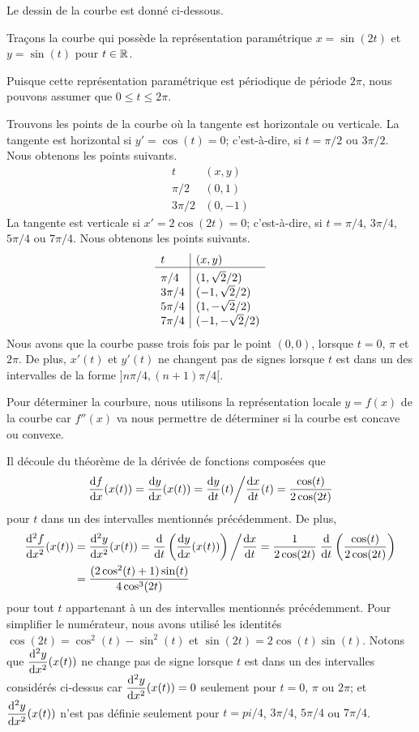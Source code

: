 {\begin{egg}[\theory]
Le dessin de la courbe est donné ci-dessous.
\end{egg}

\begin{egg}[\theory]
Traçons la courbe qui possède la représentation paramétrique
$x = \sin(2t)$ et $y = \sin(t)$ pour $t \in \RR$.

Puisque cette représentation paramétrique est périodique de période
$2\pi$, nous pouvons assumer que $0\leq t \leq 2\pi$.

Trouvons les points de la courbe où la tangente est
horizontale ou verticale.  La tangente est horizontal si
$y'= \cos(t)= 0$; c'est-à-dire, si $t= \pi/2$ ou $3\pi/2$.  Nous obtenons
les points suivants.
\[
\begin{array}{l|l}
t & (x,y) \\
\hline
\pi/2 & (0,1) \\
3\pi/2 & (0,-1)
\end{array}
\]
La tangente est verticale si $x'= 2\cos(2t) = 0$; c'est-à-dire, si
$t=\pi/4$, $3\pi/4$, $5\pi/4$ ou $7\pi/4$.  Nous obtenons les points
suivants.
\[
\begin{array}{l|l}
t & (x,y) \\
\hline
\rule{0em}{1.2em} \pi/4 & (1, \sqrt{2}/2) \\
3\pi/4 & (-1, \sqrt{2}/2) \\
5\pi/4 & (1, -\sqrt{2}/2) \\
7\pi/4 & (-1, -\sqrt{2}/2)
\end{array}
\]
Nous avons que la courbe passe trois fois par le point $(0,0)$, lorsque
$t=0$, $\pi$ et $2\pi$.  De plus, $x'(t)$ et $y'(t)$ ne changent pas
de signes lorsque $t$ est dans un des intervalles de la forme
$]n\pi/4 , (n+1)\pi/4[$. 

Pour déterminer la courbure, nous utilisons la représentation locale
$y=f(x)$ de la courbe car $f''(x)$ va nous permettre de déterminer
si la courbe est concave ou convexe.

Il découle du théorème de la dérivée de fonctions composées que
\[
\dydx{f}{x}(x(t)) = \dydx{y}{x}(x(t)) = \dydx{y}{t}(t) \bigg/ \dydx{x}{t}(t)
= \frac{\cos(t)}{2\cos(2t)}
\]
pour $t$ dans un des intervalles mentionnés précédemment.  De plus,
\begin{align*}
\dydxn{f}{x}{2}(x(t)) &= \dydxn{y}{x}{2}(x(t)) =
\dfdx{\left( \dydx{y}{x}(x(t)) \right)}{t}\bigg/\dydx{x}{t}
= \frac{1}{2\cos(2t)}\;
\dfdx{\left( \frac{\cos(t)}{2\cos(2t)} \right)}{t} \\
&= \frac{(2\cos^2(t)+1)\sin(t)}{4\cos^3(2t)}
\end{align*}
pour tout $t$ appartenant à un des intervalles mentionnés
précédemment.  Pour simplifier le numérateur, nous avons utilisé les
identités $\cos(2t) = \cos^2(t)-\sin^2(t)$ et $\sin(2t) = 2\cos(t)\sin(t)$.
Notons que $\displaystyle \dydxn{y}{x}{2}(x(t))$ ne change pas de
signe lorsque $t$ est dans un des intervalles considérés ci-dessus
car $\displaystyle \dydxn{y}{x}{2}(x(t)) =0$ seulement pour $t=0$,
$\pi$ ou $2\pi$; et $\displaystyle \dydxn{y}{x}{2}(x(t))$ n'est pas
définie seulement pour $t= pi/4$, $3\pi/4$, $5\pi/4$ ou $7\pi/4$.


\end{egg}}
